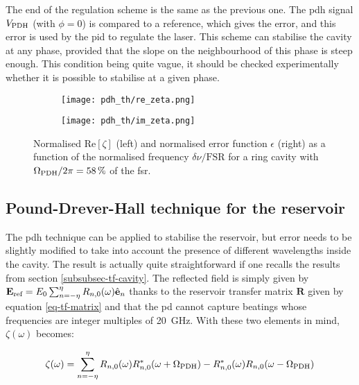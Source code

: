The end of the regulation scheme is the same as the previous one. The \gls{pdh} signal $V_{\text{PDH}}$ (with $\phi=0$) is compared to a reference, which gives the error, and this error is used by the \gls{pid} to regulate the laser. This scheme can stabilise the cavity at any phase, provided that the slope on the neighbourhood of this phase is steep enough. This condition being quite vague, it should be checked experimentally whether it is possible to stabilise at a given phase.\\

\begin{figure}[h]
	\centering
	\begin{subfigure}{.5\textwidth}
		\centering
		\texttt{[image: pdh\_th/re\_zeta.png]}
	\end{subfigure}%
	\begin{subfigure}{.5\textwidth}
		\centering
		\texttt{[image: pdh\_th/im\_zeta.png]}
	\end{subfigure}
	\caption{Normalised $\text{Re}[\zeta]$ (left) and normalised \pdh error function $\epsilon$ (right) as a function of the normalised frequency $\delta \nu / \text{FSR}$ for a ring cavity with $\Omega_{\text{PDH}}/2\pi=\SI{58}{\percent}$ of the \gls{fsr}.}
	\label{zeta}
\end{figure}


\subsection{Pound-Drever-Hall technique for the reservoir}

The \gls{pdh} technique can be applied to stabilise the reservoir, but error needs to be slightly modified to take into account the presence of different wavelengths inside the cavity. The result is actually quite straightforward if one recalls the results from section \ref{subsubsec-tf-cavity}. The reflected field is simply given by $\mathbf{E}_{\text{ref}} = E_0 \sum_{n=-\eta}^\eta R_{n,0}(\omega) \hat{\mathbf{e}}_n$ thanks to the reservoir transfer matrix $\mathbf{R}$ given by equation \eqref{eq-tf-matrix} and that the \gls{pd} cannot capture beatings whose frequencies are integer multiples of \SI{20}{\giga\hertz}. With these two elements in mind, $\zeta(\omega)$ becomes:

\begin{equation}
	\zeta(\omega) = \sum_{n=-\eta}^\eta R_{n,0}(\omega)R_{n,0}^*(\omega+\Omega_{\text{PDH}}) - R_{n,0}^*(\omega) R_{n,0}(\omega - \Omega_{\text{PDH}})
\end{equation}


